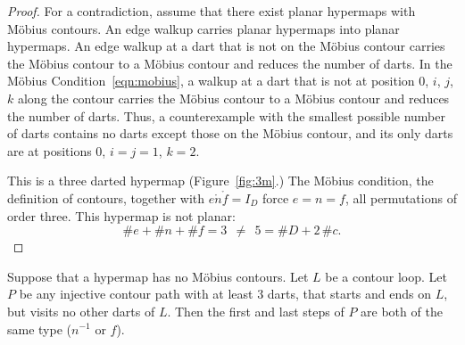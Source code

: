 \begin{proof} For a contradiction, assume that there exist planar
hypermaps with M\"obius contours.  An edge walkup carries
planar hypermaps into planar hypermaps. An edge walkup
at a dart that is not on the M\"obius contour carries the
M\"obius contour to a M\"obius contour 
and reduces the number of darts.  
In the M\"obius Condition~\ref{eqn:mobius},
a walkup at a dart that is not at position $0$, $i$, $j$, $k$
along the contour carries the M\"obius contour to a M\"obius contour
and reduces the number of darts. Thus, a counterexample with
the smallest possible number of darts contains no
darts except those on the M\"obius contour, and its only darts
are at positions $0$, $i=j=1$, $k=2$.

This is a three darted hypermap (Figure~\ref{fig:3m}.)  
The M\"obius condition, the
definition of contours, together with $e\ocirc n\ocirc f=I_D$ force
$e=n=f$, all permutations of order three.  This hypermap is not planar:
\begin{displaymath}\# e + \# n + \# f = 3~~\ne~~ 5 = \# D + 2\,
\#c.\end{displaymath}
\end{proof}



%
%

\begin{lemma}\label{lemma:contour-path-type}
Suppose that a hypermap has no M\"obius contours. Let $L$ be a
contour loop.  Let $P$ be any injective contour path with at least
$3$ darts, that starts and ends on $L$, but visits no other darts of
$L$.  Then the first and last steps of $P$ are both of the same type
($n^{-1}$ or $f$).
\end{lemma}
%

